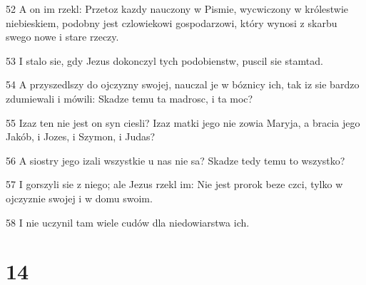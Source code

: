\par 52 A on im rzekl: Przetoz kazdy nauczony w Pismie, wycwiczony w królestwie niebieskiem, podobny jest czlowiekowi gospodarzowi, który wynosi z skarbu swego nowe i stare rzeczy.
\par 53 I stalo sie, gdy Jezus dokonczyl tych podobienstw, puscil sie stamtad.
\par 54 A przyszedlszy do ojczyzny swojej, nauczal je w bóznicy ich, tak iz sie bardzo zdumiewali i mówili: Skadze temu ta madrosc, i ta moc?
\par 55 Izaz ten nie jest on syn ciesli? Izaz matki jego nie zowia Maryja, a bracia jego Jakób, i Jozes, i Szymon, i Judas?
\par 56 A siostry jego izali wszystkie u nas nie sa? Skadze tedy temu to wszystko?
\par 57 I gorszyli sie z niego; ale Jezus rzekl im: Nie jest prorok beze czci, tylko w ojczyznie swojej i w domu swoim.
\par 58 I nie uczynil tam wiele cudów dla niedowiarstwa ich.

\chapter{14}

